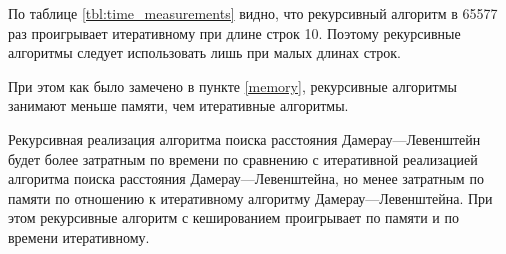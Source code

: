 По таблице \ref{tbl:time_measurements} видно, что рекурсивный алгоритм в 65577 раз проигрывает итеративному при длине строк 10. Поэтому рекурсивные алгоритмы следует использовать лишь при малых длинах строк.

При этом как было замечено в пункте \ref{memory}, рекурсивные алгоритмы занимают меньше памяти, чем итеративные алгоритмы.

Рекурсивная реализация алгоритма поиска расстояния Дамерау---Левенштейн будет более затратным по времени по сравнению с итеративной реализацией алгоритма поиска расстояния Дамерау---Левенштейна, но менее затратным по памяти по отношению к итеративному алгоритму Дамерау---Левенштейна. При этом рекурсивные алгоритм с кешированием проигрывает по памяти и по времени итеративному.